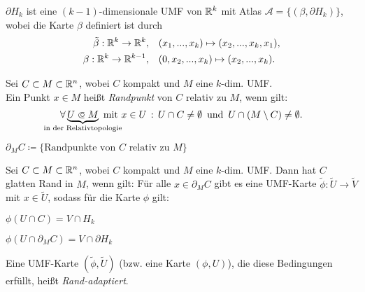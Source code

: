 \documentclass{cheat-sheet}
\newcommand{\Atlas}{\mathcal{A}} %
\theoremstyle{definition}
\begin{document}
\begin{beob}
  $\partial H_k$ ist eine $(k{-}1)$-dimensionale UMF von $\mathbb{R}^k$ mit Atlas $\Atlas = \{ (\beta, \partial H_k) \}$, wobei die Karte $\beta$ definiert ist durch
  \begin{align*}
    \tilde{\beta} : \mathbb{R}^k \to \mathbb{R}^k, \quad &(x_1, ..., x_k) \mapsto (x_2, ..., x_k, x_1), \\
    \beta : \mathbb{R}^k \to \mathbb{R}^{k-1}, \quad &(0, x_2, ..., x_k) \mapsto (x_2, ..., x_k).
  \end{align*}
\end{beob}


\begin{defn}
  Sei $C \subset M \subset \mathbb{R}^n$, wobei $C$ kompakt und $M$ eine $k$-dim. UMF.\\
  Ein Punkt $x \in M$ heißt \emph{Randpunkt} von $C$ relativ zu $M$, wenn gilt:
  \[ \fa{\underbrace{U \opn M}_{\mathclap{\text{in der Relativtopologie}}} \text{ mit } x \in U} U \cap C \not= \emptyset \enspace \text{und} \enspace U \cap (M \setminus C) \not= \emptyset. \]
\end{defn}


\begin{nota}
  $\partial_M C \coloneqq \{ \text{Randpunkte von $C$ relativ zu $M$} \}$
\end{nota}

\begin{defn}
  Sei $C \subset M \subset \mathbb{R}^n$, wobei $C$ kompakt und $M$ eine $k$-dim. UMF.
  Dann hat $C$ glatten Rand in $M$, wenn gilt: Für alle $x \in \partial_M C$ gibt es eine UMF-Karte $\widetilde{\phi} : \widetilde{U} \to \widetilde{V}$ mit $x \in \widetilde{U}$, sodass für die Karte $\phi$ gilt:
  \begin{itemize}
    \begin{multicols}{2}
      \item $\phi(U \cap C) = V \cap H_k$
      \item $\phi(U \cap \partial_M C) = V \cap \partial H_k$
    \end{multicols}
  \end{itemize}
\end{defn}

\begin{defn}
  Eine UMF-Karte $(\widetilde{\phi}, \widetilde{U})$ (bzw. eine Karte $(\phi, U)$), die diese Bedingungen erfüllt, heißt \emph{Rand-adaptiert}.
\end{defn}
\end{document}
